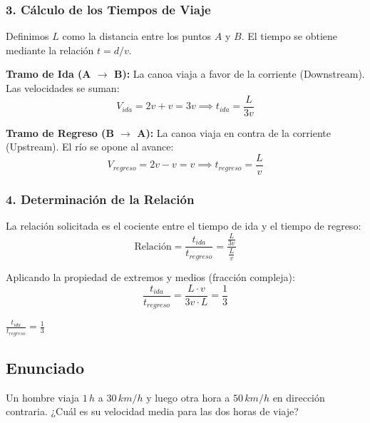 \documentclass[12pt, a4paper]{article}
\begin{document}
\subsubsection*{3. Cálculo de los Tiempos de Viaje}

Definimos $L$ como la distancia entre los puntos $A$ y $B$. El tiempo se obtiene mediante la relación $t = d/v$.

\textbf{Tramo de Ida (A $\to$ B):}
La canoa viaja a favor de la corriente (Downstream). Las velocidades se suman:
\begin{equation}
    V_{ida} = 2v + v = 3v \implies t_{ida} = \frac{L}{3v}
\end{equation}

\textbf{Tramo de Regreso (B $\to$ A):}
La canoa viaja en contra de la corriente (Upstream). El río se opone al avance:
\begin{equation}
    V_{regreso} = 2v - v = v \implies t_{regreso} = \frac{L}{v}
\end{equation}

\subsubsection*{4. Determinación de la Relación}

La relación solicitada es el cociente entre el tiempo de ida y el tiempo de regreso:
\begin{equation}
    \text{Relación} = \frac{t_{ida}}{t_{regreso}} = \frac{\frac{L}{3v}}{\frac{L}{v}}
\end{equation}

Aplicando la propiedad de extremos y medios (fracción compleja):
\begin{equation}
    \frac{t_{ida}}{t_{regreso}} = \frac{L \cdot v}{3v \cdot L} = \frac{1}{3}
\end{equation}

\begin{tcolorbox}[colback=blue!5!white, colframe=blue!75!black, title=Respuesta Final]
\centering
\Large $\frac{t_{ida}}{t_{regreso}} = \frac{1}{3}$
\end{tcolorbox}

\newpage

\subsection*{Enunciado}

Un hombre viaja $1 \, \si{h}$ a $30 \, \si{km/h}$ y luego otra hora a $50 \, \si{km/h}$ en dirección contraria. ¿Cuál es su velocidad media para las dos horas de viaje?
\end{document}
